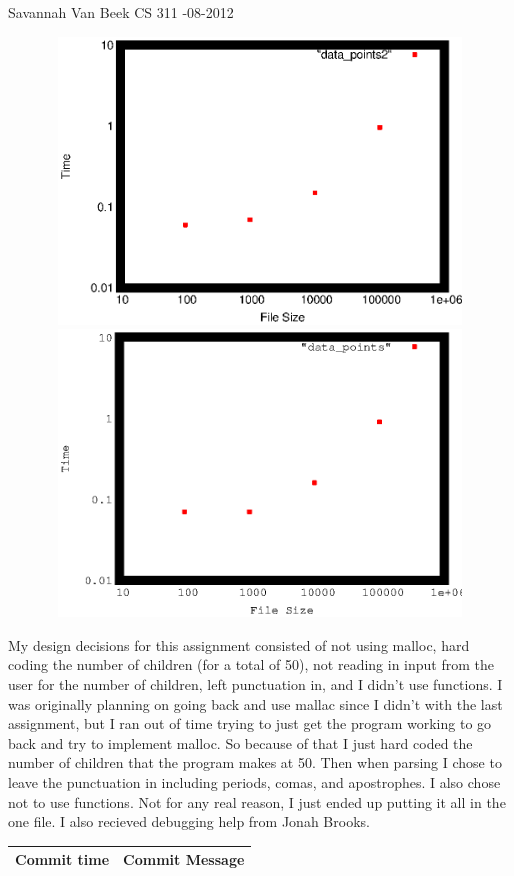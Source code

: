 \documentclass[letterpaper,10pt,twocolumn,titlepage]{article}
\begin{document}
Savannah Van Beek \newline
CS 311			  -08-2012		  \newline

\begin{figure}[h!]
\includegraphics[width=6in, height=3in]{things.eps}
\includegraphics[width=6in, height=3in]{stuff.eps}

\end{figure}

My design decisions for this assignment consisted of not using malloc, hard coding the number of children (for a total of 50), not reading in input from the user for the number of children, left punctuation in, and I didn't use functions. I was originally planning on going back and use mallac since I didn't with the last assignment, but I ran out of time trying to just get the program working to go back and try to implement malloc. So because of that I just hard coded the number of children that the 
\vfill\break
\vspace*{6.82in}
program makes at 50. Then when parsing I chose to leave the punctuation in including periods, comas, and apostrophes. I also chose not to use functions. Not for any real reason, I just ended up putting it all in the one file. I also recieved debugging help from Jonah Brooks.

\vfill\break

\begin{tabular}{ | p{3in} | p{3in} | } 
\hline 
Commit time & Commit Message \\ \hline

\end{tabular}
 
\end{document}
